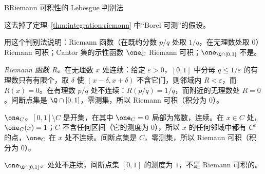 \begin{probleme}{B}{Riemann 可积性的 Lebesgue 判别法}
\begin{questions}
\begin{solution}
这去掉了定理~\ref{thm:integration:riemann} 中“Borel 可测”的假设。
\end{solution}
\item 用这个判别法说明：Riemann 函数（在既约分数 $p/q$ 处取 $1/q$，在无理数处取 $0$）Riemann 可积；Cantor 集的示性函数 $\one_C$ Riemann 可积；$\one_{\Q\cap[0,1]}$ 不是。
\begin{solution}
\emph{Riemann 函数 $R$。}在无理数 $x$ 处连续：给定 $\varepsilon>0$，$[0,1]$ 中分母 $q\leqslant1/\varepsilon$ 的有理数只有有限个，取 $\delta$ 使 $(x-\delta,x+\delta)$ 不含它们，则邻域内 $R<\varepsilon$，而 $R(x)=0$。在有理数 $p/q$ 处不连续：$R(p/q)=1/q$，而附近的无理数处 $R=0$。间断点集是 $\Q\cap[0,1]$，零测集，所以 Riemann 可积（积分为 $0$）。

\emph{$\one_C$。}$[0,1]\setminus C$ 是开集，在其中 $\one_C=0$ 局部为常数，连续。在 $x\in C$ 处，$\one_C(x)=1$；$C$ 不含任何区间（它的测度为 $0$），所以 $x$ 的任何邻域中都有 $C^c$ 的点，$\one_C$ 在 $x$ 处不连续。间断点集是 $C$，零测集，所以 Riemann 可积（积分为 $0$）。

\emph{$\one_{\Q\cap[0,1]}$。}处处不连续，间断点集 $[0,1]$ 的测度为 $1$，不是 Riemann 可积的。
\end{solution}
\end{questions}
\end{probleme}

